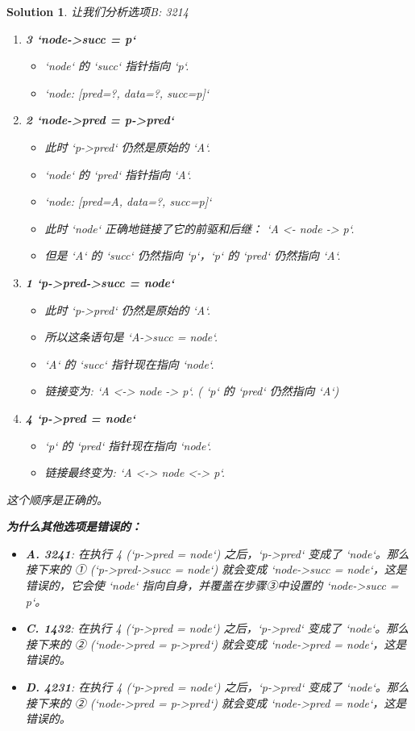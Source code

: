 \documentclass[UTF8]{report}
\newtheorem{solution}{Solution}
\theoremstyle{MyLineTheoremStyle} %
\theoremstyle{MyBlockTheoremStyle} %
\theoremstyle{MySubsubsectionStyle} %
\begin{document}
\begin{solution}
让我们分析选项B: 3214
\begin{enumerate}
    \item \textbf{3 `node->succ = p`}
    \begin{itemize}
        \item `node` 的 `succ` 指针指向 `p`.
        \item `node: [pred=?, data=?, succ=p]`
    \end{itemize}
    \item \textbf{2 `node->pred = p->pred`}
    \begin{itemize}
        \item 此时 `p->pred` 仍然是原始的 `A`.
        \item `node` 的 `pred` 指针指向 `A`.
        \item `node: [pred=A, data=?, succ=p]`
        \item 此时 `node` 正确地链接了它的前驱和后继： `A <- node -> p`.
        \item 但是 `A` 的 `succ` 仍然指向 `p`，`p` 的 `pred` 仍然指向 `A`.
    \end{itemize}
    \item \textbf{1 `p->pred->succ = node`}
    \begin{itemize}
        \item 此时 `p->pred` 仍然是原始的 `A`.
        \item 所以这条语句是 `A->succ = node`.
        \item `A` 的 `succ` 指针现在指向 `node`.
        \item 链接变为: `A <-> node -> p`. ( `p` 的 `pred` 仍然指向 `A`)
    \end{itemize}
    \item \textbf{4 `p->pred = node`}
    \begin{itemize}
        \item `p` 的 `pred` 指针现在指向 `node`.
        \item 链接最终变为: `A <-> node <-> p`.
    \end{itemize}
\end{enumerate}
这个顺序是正确的。

\textbf{为什么其他选项是错误的：}
\begin{itemize}
    \item \textbf{A. 3241}: 在执行 4 (`p->pred = node`) 之后，`p->pred` 变成了 `node`。那么接下来的 ① (`p->pred->succ = node`) 就会变成 `node->succ = node`，这是错误的，它会使 `node` 指向自身，并覆盖在步骤③中设置的 `node->succ = p`。
    \item \textbf{C. 1432}: 在执行 4 (`p->pred = node`) 之后，`p->pred` 变成了 `node`。那么接下来的 ② (`node->pred = p->pred`) 就会变成 `node->pred = node`，这是错误的。
    \item \textbf{D. 4231}: 在执行 4 (`p->pred = node`) 之后，`p->pred` 变成了 `node`。那么接下来的 ② (`node->pred = p->pred`) 就会变成 `node->pred = node`，这是错误的。
\end{itemize}
\end{solution}
\end{document}
